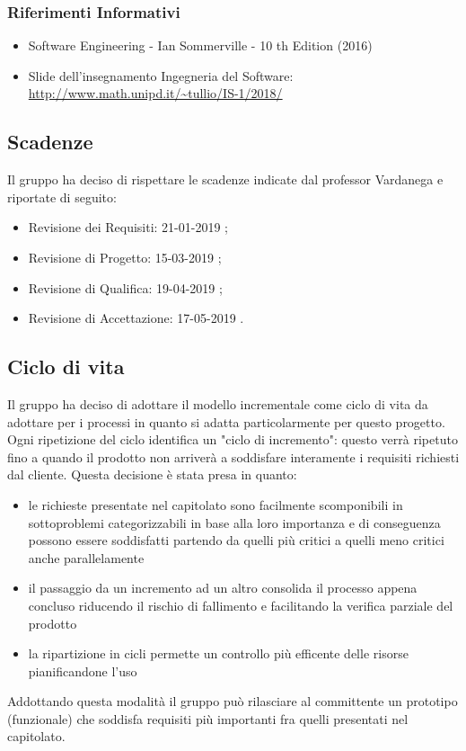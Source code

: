 		\subsubsection{Riferimenti Informativi}
			\begin{itemize}
				\item Software Engineering - Ian Sommerville - 10 th Edition (2016)
				\item Slide dell’insegnamento Ingegneria del Software:\\
				\url{http://www.math.unipd.it/~tullio/IS-1/2018/}
			\end{itemize}
		
	\subsection{Scadenze}
	Il gruppo ha deciso di rispettare le scadenze indicate dal professor Vardanega e riportate di seguito:
	\begin{itemize}
		\item Revisione dei Requisiti: 21-01-2019 ;
		\item Revisione di Progetto: 15-03-2019 ;
		\item Revisione di Qualifica: 19-04-2019 ;
		\item Revisione di Accettazione: 17-05-2019 .
	\end{itemize}
	
	\subsection{Ciclo di vita}
	Il gruppo ha deciso di adottare il modello incrementale come ciclo di vita da adottare per i processi in quanto si adatta particolarmente per questo progetto.
	Ogni ripetizione del ciclo identifica un "ciclo di incremento": questo verrà ripetuto fino a quando il prodotto non arriverà a soddisfare interamente i requisiti richiesti dal cliente.
	Questa decisione è stata presa in quanto:
	\begin{itemize}
		\item le richieste presentate nel capitolato sono facilmente scomponibili in sottoproblemi categorizzabili in base alla loro importanza e di conseguenza possono essere soddisfatti partendo da quelli più critici a quelli meno critici anche parallelamente
		\item il passaggio da un incremento ad un altro consolida il processo appena concluso riducendo il rischio di fallimento e facilitando la verifica parziale del prodotto
		\item la ripartizione in cicli permette un controllo più efficente delle risorse pianificandone l'uso
	\end{itemize}
	Addottando questa modalità il gruppo può rilasciare al committente un prototipo (funzionale) che soddisfa requisiti più importanti fra quelli presentati nel capitolato.
	
